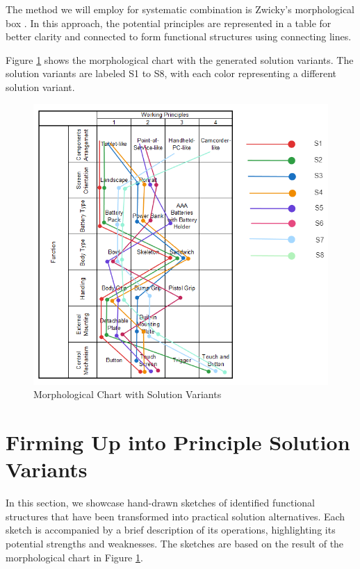 The method we will employ for systematic combination is Zwicky's morphological box \cite{Kushahrin22}. In this approach, the potential principles are represented in a table for better clarity and connected to form functional structures using connecting lines.

Figure \ref{fig:morphological-chart-with-solution-variants} shows the morphological chart with the generated solution variants. The solution variants are labeled S1 to S8, with each color representing a different solution variant.

\begin{figure}[ht!]
    \centering
    \includegraphics[width=\linewidth]{texs/Part1/chapter3/image/combinedchart.png}
    \caption{Morphological Chart with Solution Variants}
    \label{fig:morphological-chart-with-solution-variants}
\end{figure}

\section{Firming Up into Principle Solution Variants}
In this section, we showcase hand-drawn sketches of identified functional structures that have been transformed into practical solution alternatives. Each sketch is accompanied by a brief description of its operations, highlighting its potential strengths and weaknesses. The sketches are based on the result of the morphological chart in Figure \ref{fig:morphological-chart-with-solution-variants}.

